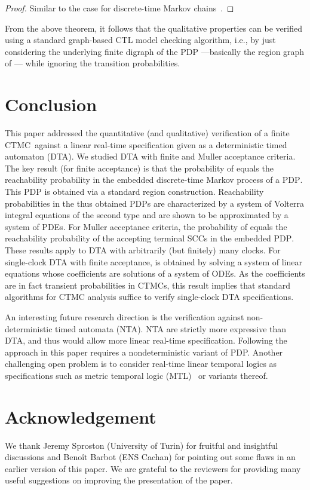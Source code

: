 \documentclass{LMCS}
\newcommand{\<}{\langle}
\renewcommand{\>}{\rangle}
\newcommand{\CTMC}{\textsc{{CTMC}}}
\newcommand{\PDP}{\textsc{PDP}}
\begin{document}
\begin{proof}
Similar to the case for discrete-time Markov chains~\cite[Chapter 10]{BaKa08}.
\end{proof}

From the above theorem, it follows that the qualitative properties can be verified using a
standard graph-based CTL model checking algorithm, i.e., by just considering the
underlying finite digraph of the PDP  ---basically the
region graph of --- while ignoring the transition probabilities.



\section{Conclusion}\label{sec:concl}
This paper addressed the quantitative (and qualitative) verification of a finite \CTMC\
 against a linear real-time specification given as a deterministic timed automaton
(DTA).
We studied DTA with finite and Muller acceptance criteria.
The key result (for finite acceptance) is that the probability of  equals
the reachability probability in the embedded discrete-time Markov process of a \PDP.
This PDP is obtained via a standard region construction.
Reachability probabilities in the thus obtained PDPs are characterized by a system of
Volterra integral equations of the second type and are shown to be approximated by a
system of  PDEs.
For Muller acceptance criteria, the probability of  equals the reachability
probability of the accepting terminal SCCs in the embedded \PDP.
These results apply to DTA with arbitrarily (but finitely) many clocks.
For single-clock DTA with finite acceptance,  is obtained by
solving a system of linear equations whose coefficients are solutions of a system of ODEs.
As the coefficients are in fact transient probabilities in CTMCs, this result implies that
standard algorithms for CTMC analysis suffice to verify single-clock DTA specifications.

An interesting future research direction is the verification against non-deterministic timed
automata (NTA).
NTA are strictly more expressive than DTA, and thus would allow more linear real-time
specification.
Following the approach in this paper requires a nondeterministic variant of PDP.
Another challenging open problem is to consider real-time linear temporal logics as
specifications such as metric temporal logic (MTL)~\cite{Koy90} or variants thereof.

\section*{Acknowledgement}
\begin{small}
We thank Jeremy Sproston (University of Turin) for fruitful and insightful discussions and
Beno\^it Barbot (ENS Cachan) for pointing out some flaws in an earlier version of this
paper.
We are grateful to the reviewers for providing many useful suggestions on improving the
presentation of the paper.
\end{small}



\end{document}
